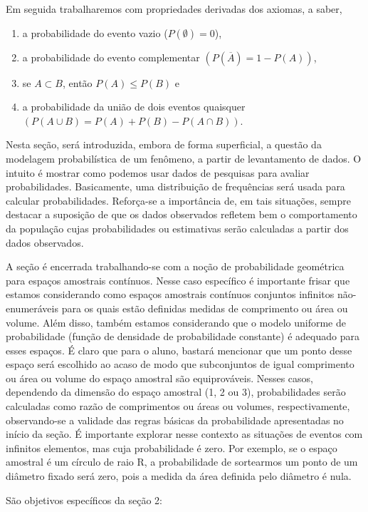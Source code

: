 \begin{paginatexto}
{Em seguida trabalharemos com propriedades derivadas dos axiomas, a saber, 
\begin{enumerate}
\item a probabilidade do evento vazio ($P(\emptyset)=0$),
\item a probabilidade do evento complementar $(P(\overline{A})=1-P(A))$, 
\item se $A\subset B$, então $P(A)\leq P(B)$ e 
\item a probabilidade da união de dois eventos quaisquer $(P(A\cup B)=P(A)+P(B)-P(A\cap B))$.
\end{enumerate}

Nesta seção, será introduzida, embora de forma superficial, a questão da modelagem probabilística de um fenômeno, a partir de levantamento de dados. O intuito é mostrar como podemos usar dados de pesquisas para avaliar probabilidades. Basicamente, uma distribuição de frequências será usada para calcular probabilidades. Reforça-se a importância de, em tais situações, sempre destacar a suposição de que os dados observados refletem bem o comportamento da população cujas probabilidades ou estimativas serão calculadas a partir dos dados observados.

A seção é encerrada trabalhando-se com a noção de probabilidade geométrica para espaços amostrais contínuos. Nesse caso específico é importante frisar que estamos considerando como espaços amostrais contínuos conjuntos infinitos não-enumeráveis para os quais estão definidas medidas de comprimento ou área ou volume. Além disso, também estamos considerando que o modelo uniforme de probabilidade (função de densidade de probabilidade constante) é adequado para esses espaços. É claro que para o aluno, bastará mencionar que um ponto desse espaço será escolhido ao acaso de modo que subconjuntos de igual comprimento ou área ou volume do espaço amostral são equiprováveis. Nesses casos, dependendo da dimensão do espaço amostral (1, 2 ou 3), probabilidades serão calculadas como razão de comprimentos ou áreas ou volumes, respectivamente, observando-se a validade das regras básicas da probabilidade apresentadas no início da seção. É importante explorar nesse contexto as situações de eventos com infinitos elementos, mas cuja probabilidade é zero. Por exemplo, se o espaço amostral é um círculo de raio R, a probabilidade de sortearmos um ponto de um diâmetro fixado será zero, pois a medida da área definida pelo diâmetro é nula.

São objetivos específicos da seção 2:

}
\end{paginatexto}
